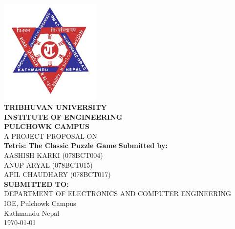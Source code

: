
\begin{titlepage}
	
	\newcommand{\HRule}{\rule{\linewidth}{0.3mm}}
	\centering
	\vfill
	\includegraphics[width=50mm]{images/tu.jpg}\\[0.75cm]
	\textsc{\Large \bfseries  TRIBHUVAN UNIVERSITY}\\[0.25cm] %
	\textsc{\Large \bfseries INSTITUTE OF ENGINEERING}\\[0.25cm]
	\textsc{\Large \bfseries  PULCHOWK CAMPUS}\\
	\vfill
	\large {A PROJECT PROPOSAL ON }\\
	\Large \textbf{Tetris: The Classic Puzzle Game}
	\vfill
	\large
		\textbf{Submitted by:}\\
	AASHISH KARKI (078BCT004)\\
	ANUP ARYAL (078BCT015)\\
	APIL CHAUDHARY (078BCT017)\\[0.5cm]
	\vfill
		\textbf{SUBMITTED TO:}\\
	DEPARTMENT OF ELECTRONICS AND COMPUTER ENGINEERING\\
	IOE, Pulchowk Campus\\
	Kathmandu Nepal
	\\
	\vfill
	{\large \today}
	\vfill
\end{titlepage}
